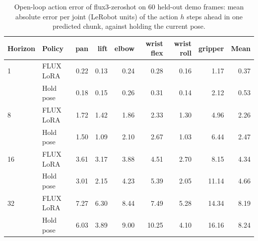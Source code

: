 \begin{table}[t]
\centering
\small
\begin{tabular}{llrrrrrrr}
\toprule
Horizon & Policy & pan & lift & elbow & wrist flex & wrist roll & gripper & Mean \\
\midrule
1 & FLUX LoRA & 0.22 & 0.13 & 0.24 & 0.28 & 0.16 & 1.17 & 0.37 \\
 & Hold pose & 0.18 & 0.15 & 0.26 & 0.31 & 0.14 & 2.12 & 0.53 \\
\midrule
8 & FLUX LoRA & 1.72 & 1.42 & 1.86 & 2.33 & 1.30 & 4.96 & 2.26 \\
 & Hold pose & 1.50 & 1.09 & 2.10 & 2.67 & 1.03 & 6.44 & 2.47 \\
\midrule
16 & FLUX LoRA & 3.61 & 3.17 & 3.88 & 4.51 & 2.70 & 8.15 & 4.34 \\
 & Hold pose & 3.01 & 2.15 & 4.23 & 5.39 & 2.05 & 11.14 & 4.66 \\
\midrule
32 & FLUX LoRA & 7.27 & 6.30 & 8.44 & 7.49 & 5.28 & 14.34 & 8.19 \\
 & Hold pose & 6.03 & 3.89 & 9.00 & 10.25 & 4.10 & 16.16 & 8.24 \\
\bottomrule
\end{tabular}
\caption{Open-loop action error of flux3-zeroshot on 60 held-out demo frames: mean absolute error per joint (LeRobot units) of the action $h$ steps ahead in one predicted chunk, against holding the current pose.}
\label{tab:flux-openloop}
\end{table}
